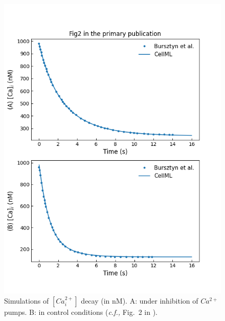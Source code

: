 \documentclass[fleqn,10pt]{physiome}
\begin{document}
\begin{figure}
\centering
\begin{minipage}[t]{\dimexpr.5\textwidth-0.2em}
  \centering
  \includegraphics[width=\linewidth]{./figs/simFig2.png}
  \caption{Simulations of $[Ca_{i}^{2+}]$ decay (in nM). A: under inhibition of $Ca^{2+}$ pumps. B: in control conditions (\emph{c.f.,} Fig.~2 in \citet{bursztyn2007mathematical}).}
  \label{simFig2}
\end{minipage}\hfill
\begin{minipage}[t]{\dimexpr.5\textwidth-0.2em}
  \centering

\end{minipage}
\end{figure}
\end{document}

